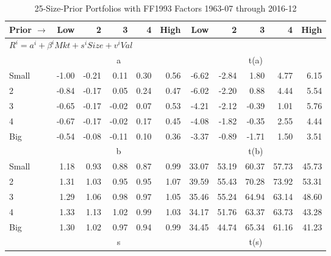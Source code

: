 
\begin{table}[!ht]
\centering
\caption{25-Size-Prior Portfolios with FF1993 Factors 1963-07 through 2016-12}
\begin{tabular}{lrrrrrrrrrr}
  \toprule
    Prior $\rightarrow$ & Low & 2 & 3 & 4 & High & Low & 2 & 3 & 4 & High \\ 
  \midrule
  \multicolumn{11}{l}{$R^i=a^i+\beta^iMkt+s^iSize+v^iVal$} \\

  
    
      & \multicolumn{5}{c}{a} & \multicolumn{5}{c}{t(a)}
    
    \\
      \cmidrule(r){2-6} \cmidrule(r){7-11}

    Small   & -1.00  & -0.21  & 0.11  & 0.30  & 0.56  & -6.62  & -2.84  & 1.80  & 4.77  & 6.15  \\
         2  & -0.84  & -0.17  & 0.05  & 0.24  & 0.47  & -6.02  & -2.20  & 0.88  & 4.44  & 5.54  \\
         3  & -0.65  & -0.17  & -0.02  & 0.07  & 0.53  & -4.21  & -2.12  & -0.39  & 1.01  & 5.76  \\
         4  & -0.67  & -0.17  & -0.02  & 0.17  & 0.45  & -4.08  & -1.82  & -0.35  & 2.55  & 4.44  \\
    Big     & -0.54  & -0.08  & -0.11  & 0.10  & 0.36  & -3.37  & -0.89  & -1.71  & 1.50  & 3.51  \\

  
    
      & \multicolumn{5}{c}{b} & \multicolumn{5}{c}{t(b)}
    
    \\
      \cmidrule(r){2-6} \cmidrule(r){7-11}

    Small   & 1.18  & 0.93  & 0.88  & 0.87  & 0.99  & 33.07  & 53.19  & 60.37  & 57.73  & 45.73  \\
         2  & 1.31  & 1.03  & 0.95  & 0.95  & 1.07  & 39.59  & 55.43  & 70.28  & 73.92  & 53.31  \\
         3  & 1.29  & 1.06  & 0.98  & 0.97  & 1.05  & 35.46  & 55.24  & 64.94  & 63.14  & 48.60  \\
         4  & 1.33  & 1.13  & 1.02  & 0.99  & 1.03  & 34.17  & 51.76  & 63.37  & 63.73  & 43.28  \\
    Big     & 1.30  & 1.02  & 0.97  & 0.94  & 0.99  & 34.45  & 44.74  & 65.34  & 61.16  & 41.23  \\

  
    
      & \multicolumn{5}{c}{s} & \multicolumn{5}{c}{t(s)}
    

\end{tabular}
\end{table}
